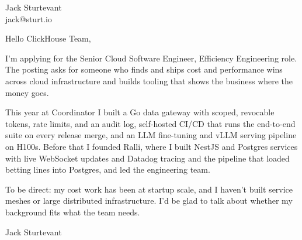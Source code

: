 \documentclass[11pt]{article}
\begin{document}
\raggedright

{\namefont\fontsize{20pt}{24pt}\selectfont Jack Sturtevant}\\[-0.3em]
jack@sturt.io

\vspace{1.2em}

Hello ClickHouse Team,

I'm applying for the Senior Cloud Software Engineer, Efficiency Engineering role. The posting asks for someone who finds and ships cost and performance wins across cloud infrastructure and builds tooling that shows the business where the money goes.

This year at Coordinator I built a Go data gateway with scoped, revocable tokens, rate limits, and an audit log, self-hosted CI/CD that runs the end-to-end suite on every release merge, and an LLM fine-tuning and vLLM serving pipeline on H100s. Before that I founded Ralli, where I built NestJS and Postgres services with live WebSocket updates and Datadog tracing and the pipeline that loaded betting lines into Postgres, and led the engineering team.

To be direct: my cost work has been at startup scale, and I haven't built service meshes or large distributed infrastructure. I'd be glad to talk about whether my background fits what the team needs.

\vspace{0.6em}
Jack Sturtevant
\end{document}
